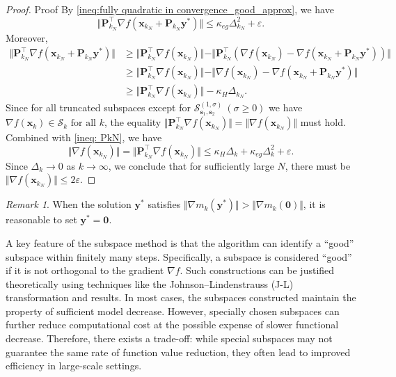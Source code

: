 \documentclass[colorlinks=true, linkcolor=blue, citecolor=blue, urlcolor=blue]{article}
\theoremstyle{plain}
\theoremstyle{definition}
\theoremstyle{remark}
\newtheorem{remark}{Remark}
\newcommand{\eps}{\varepsilon}
\begin{document}
\begin{proof}{Proof}
    By \eqref{ineq:fully quadratic in convergence_good_approx}, we have \begin{equation}\label{ineq: PkN}
        \Vert \bm P_{k_N}^\top\nabla f(\bm x_{k_N}+\bm P_{k_N}\bm y^*)\Vert\leq \kappa_{eg}\Delta_{k_N}^2+\eps.
    \end{equation}
Moreover, 
\begin{equation*}
\begin{aligned}
     \Vert \bm P_{k_N}^\top\nabla f(\bm x_{k_N}+\bm P_{k_N}\bm y^*)\Vert&\geq \Vert \bm P_{k_N}^\top\nabla f(\bm x_{k_N})\Vert-\Vert \bm P_{k_N}^\top \left(\nabla f(\bm x_{k_N})-\nabla f(\bm x_{k_N}+\bm P_{k_N}\bm y^*)\right) \Vert\\
     &\geq\Vert \bm P_{k_N}^\top\nabla f(\bm x_{k_N})\Vert-\Vert\nabla f(\bm x_{k_N})-\nabla f(\bm x_{k_N}+\bm P_{k_N}\bm y^*)\Vert\\
     &\geq \Vert \bm P_{k_N}^\top\nabla f(\bm x_{k_N})\Vert-\kappa_H\Delta_{k_N}. 
\end{aligned}
\end{equation*}
Since for all truncated subspaces except for $\mathcal{S}_{\bm s_1,\bm s_2}^{(1,\sigma)}\ (\sigma\geq 0)$ we have $\nabla f(\bm x_k)\in \mathcal{S}_k\text{ for all } k$, the equality $\Vert \bm P_{k_N}^\top\nabla f(\bm x_{k_N})\Vert=\Vert\nabla f(\bm x_{k_N})\Vert$ must hold. Combined with \eqref{ineq: PkN}, we have
\begin{equation*}
    \Vert \nabla f(\bm x_{k_N})\Vert=\Vert \bm P_{k_N}^\top\nabla f(\bm x_{k_N})\Vert\leq \kappa_{H}\Delta_k+\kappa_{eg}\Delta_k^2+\eps.
\end{equation*}
Since $\Delta_k\to 0$ as $k\to \infty$, we conclude that for sufficiently large $N$, there must be $\Vert \nabla f(\bm x_{k_N})\Vert\leq 2\eps$.
\end{proof}

\begin{remark}
    When the solution $\bm y^*$ satisfies $\Vert \nabla m_{k}(\bm y^*)\Vert>\Vert\nabla m_{k}(\bm 0)\Vert$, it is reasonable to set $\bm y^*=\bm 0$.
\end{remark}


A key feature of the subspace method is that the algorithm can identify a ``good'' subspace within finitely many steps. Specifically, a subspace is considered ``{good}'' if it is not orthogonal to the gradient $\nabla f$. Such constructions can be justified theoretically using techniques like the {\color{black}Johnson–Lindenstrauss (J-L) transformation \cite{Woodruff_2014} and results. 
In most cases, the subspaces constructed maintain the property of sufficient model decrease. However, specially chosen subspaces can further reduce computational cost at the possible expense of slower functional decrease. 
Therefore, there exists a trade-off: while special subspaces may not guarantee the same rate of function value reduction, they often lead to improved efficiency in large-scale settings.}
\end{document}
